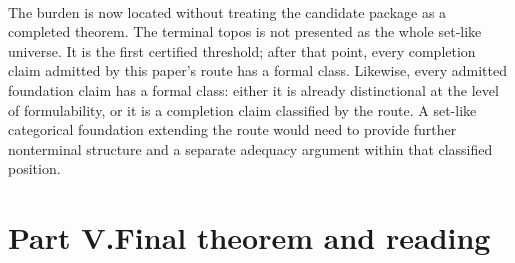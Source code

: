 \documentclass[11pt]{article}
\begin{document}
\begin{code}
\<%
\\
%
\\[\AgdaEmptyExtraSkip]%
\>[0]\<%
\\
\>[0]\AgdaSpace{}%
\AgdaSymbol{:}\<%
\\
\>[0][@{}l@{\AgdaIndent{0}}]%
\>[2]\<%
\\
\>[0]\AgdaSpace{}%
\AgdaSymbol{=}\AgdaSpace{}%
\<%
\\
\>[0][@{}l@{\AgdaIndent{0}}]%
\>[2]\AgdaSymbol{\{}\AgdaSpace{}%
\AgdaSpace{}%
\AgdaSymbol{=}\AgdaSpace{}%
\<%
\\
%
\>[2]\AgdaSymbol{;}\AgdaSpace{}%
\AgdaSpace{}%
\AgdaSymbol{=}\AgdaSpace{}%
\<%
\\
%
\>[2]\AgdaSymbol{;}%
\>[7388I]\AgdaSpace{}%
\AgdaSymbol{=}\<%
\\
\>[7388I][@{}l@{\AgdaIndent{0}}]%
\>[6]\<%
\\
%
\>[2]\AgdaSymbol{;}\AgdaSpace{}%
\AgdaSpace{}%
\AgdaSymbol{=}\AgdaSpace{}%
\<%
\\
%
\>[2]\AgdaSymbol{\}}\<%
\end{code}

The burden is now located without treating the candidate package as a
completed theorem.  The terminal topos is not presented as the whole
set-like universe.  It is the first certified threshold; after that
point, every completion claim admitted by this paper's route has a
formal class.  Likewise, every admitted foundation claim has a formal
class: either it is already distinctional at the level of formulability,
or it is a completion claim classified by the route.  A set-like
categorical foundation extending the route would need to provide further
nonterminal structure and a separate adequacy argument within that
classified position.

\part*{Part V.\quad Final theorem and reading}
\end{document}
